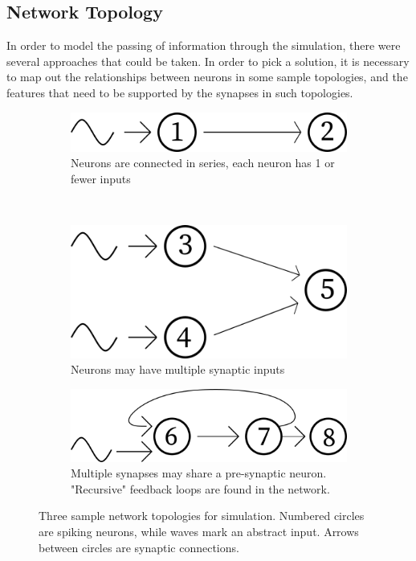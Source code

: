 \FloatBarrier

\subsection{Network Topology}

In order to model the passing of information through the simulation, there were
several approaches that could be taken. In order to pick a solution, it is
necessary to map out the relationships between neurons in some sample topologies,
and the features that need to be supported by the synapses in such topologies. 


\begin{figure}[h!]
    \begin{subfigure}{1\textwidth}
        \centering
        \includegraphics[width=0.35\linewidth]{figures/tops/top1.png}
        \caption{Neurons are connected in series, each neuron has 1 or fewer inputs}
        \label{fig:top1}
    \end{subfigure} \vspace{1ex} \\ 
    \begin{subfigure}{.5\textwidth}
        \centering
        \includegraphics[width=0.7\linewidth]{figures/tops/top2.png}
        \caption{Neurons may have multiple synaptic inputs}
        \label{fig:top2}
    \end{subfigure}
    \begin{subfigure}{.5\textwidth}
        \centering
        \includegraphics[width=0.7\linewidth]{figures/tops/top3.png}
        \caption{Multiple synapses may share a pre-synaptic neuron. "Recursive" feedback loops are found in the network.}
        \label{fig:top3}
    \end{subfigure}
    \caption[Sample network topologies for simulation]{Three sample network topologies for simulation. Numbered circles are spiking neurons, while waves mark an abstract input. Arrows between circles are synaptic connections.}
    \label{fig:tops}
\end{figure}

